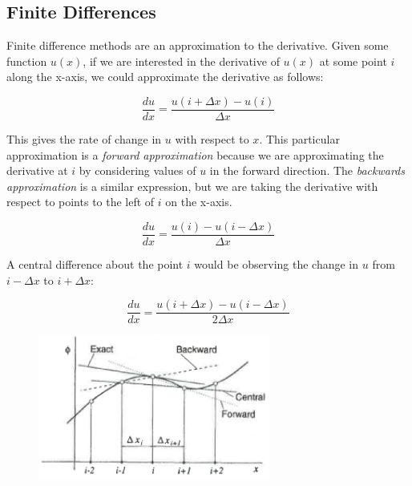 \documentclass[twocolumn,12pth]{article}
\begin{document}
\subsection{Finite Differences}

Finite difference methods are an approximation to the derivative.
Given some function $u(x)$, if we are interested in the derivative of $u(x)$ at some point $i$ along the x-axis, we could approximate the derivative as follows:

\begin{equation}
\frac{du}{dx} = \frac{u(i + \Delta{x}) - u(i)}{\Delta{x}}
\label{eq:FD}
\end{equation}

This gives the rate of change in $u$ with respect to $x$.
This particular approximation is a \textit{forward approximation} because we are approximating the derivative at $i$ by considering values of $u$ in the forward direction.
The \textit{backwards approximation} is a similar expression, but we are taking the derivative with respect to points to the left of $i$ on the x-axis.

\begin{equation}
\frac{du}{dx} = \frac{u(i) - u(i - \Delta{x})}{\Delta{x}}
\label{eq:BD}
\end{equation}

A central difference about the point $i$ would be observing the change in $u$ from $i - \Delta{x}$ to $i + \Delta{x}$:

\begin{equation}
\frac{du}{dx} = \frac{u(i + \Delta{x}) - u(i - \Delta{x})}{2\Delta{x}}
\label{eq:CD}
\end{equation}

\begin{figure}
\centering
\includegraphics[width=3.0in]{finiteDif.png}
\label{fig:difs}
\end{figure}
\end{document}
